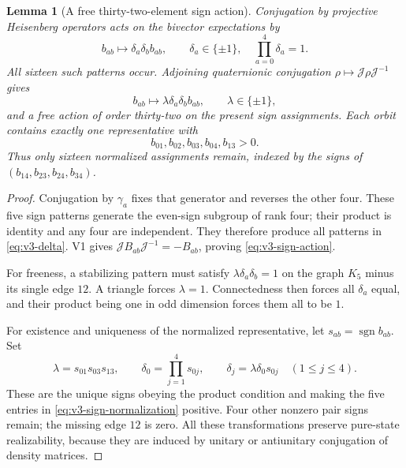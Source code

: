 \documentclass[11pt]{article}
\newtheorem{lemma}[lemma]{Lemma}
\theoremstyle{definition}
\theoremstyle{remark}
\newcommand{\Jq}{\mathcal J}
\begin{document}
\begin{lemma}[A free thirty-two-element sign action]
\label{lem:v3-sign-action}
Conjugation by projective Heisenberg operators acts on the bivector
expectations by
\begin{equation}
 b_{ab}\longmapsto\delta_a\delta_b b_{ab},
 \qquad \delta_a\in\{\pm1\},\quad\prod_{a=0}^4\delta_a=1.
 \label{eq:v3-delta}
\end{equation}
All sixteen such patterns occur. Adjoining quaternionic conjugation
$\rho\mapsto\Jq\rho\Jq^{-1}$ gives
\begin{equation}
 b_{ab}\longmapsto\lambda\delta_a\delta_b b_{ab},
 \qquad\lambda\in\{\pm1\},
 \label{eq:v3-sign-action}
\end{equation}
and a free action of order thirty-two on the present sign assignments. Each
orbit contains exactly one representative with
\begin{equation}
 b_{01},b_{02},b_{03},b_{04},b_{13}>0.
 \label{eq:v3-sign-normalization}
\end{equation}
Thus only sixteen normalized assignments remain, indexed by the signs of
$(b_{14},b_{23},b_{24},b_{34})$.
\end{lemma}
\begin{proof}
Conjugation by $\gamma_a$ fixes that generator and reverses the other four.
These five sign patterns generate the even-sign subgroup of rank four;
their product is identity and any four are independent. They therefore
produce all patterns in \eqref{eq:v3-delta}. V1 gives
$\Jq B_{ab}\Jq^{-1}=-B_{ab}$, proving \eqref{eq:v3-sign-action}.

For freeness, a stabilizing pattern must satisfy
$\lambda\delta_a\delta_b=1$ on the graph $K_5$ minus its single edge
$12$. A triangle forces $\lambda=1$. Connectedness then forces all
$\delta_a$ equal, and their product being one in odd dimension forces
them all to be $1$.

For existence and uniqueness of the normalized representative, let
$s_{ab}=\operatorname{sgn}b_{ab}$. Set
\[
 \lambda=s_{01}s_{03}s_{13},\qquad
 \delta_0=\prod_{j=1}^4s_{0j},\qquad
 \delta_j=\lambda\delta_0s_{0j}\quad(1\le j\le4).
\]
These are the unique signs obeying the product condition and making the
five entries in \eqref{eq:v3-sign-normalization} positive. Four other
nonzero pair signs remain; the missing edge $12$ is zero.
All these transformations preserve pure-state realizability, because they
are induced by unitary or antiunitary conjugation of density matrices.
\end{proof}
\end{document}
